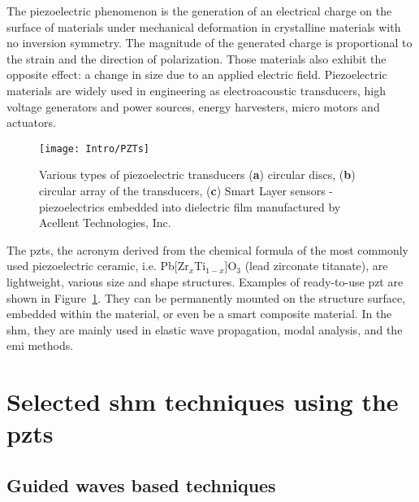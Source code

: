 \documentclass[11pt,a4paper,final]{report}
\theoremstyle{plain}
\begin{document}
The piezoelectric phenomenon is the generation of an electrical charge on the surface of materials under mechanical deformation in crystalline materials with no inversion symmetry.
The magnitude of the generated charge is proportional to the strain and the direction of polarization.
Those materials also exhibit the opposite effect: a change in size due to an applied electric field.
Piezoelectric materials are widely used in engineering as electroacoustic transducers, high voltage generators and power sources, energy harvesters, micro motors and actuators.
\begin{figure}[H]
	\begin{center}
		\texttt{[image: Intro/PZTs]}
	\end{center}
	\caption{Various types of piezoelectric transducers (\textbf{a}) circular discs, (\textbf{b}) circular array of the transducers, (\textbf{c}) Smart Layer\textsuperscript{\tiny\textregistered} sensors - piezoelectrics embedded into dielectric film manufactured by Acellent Technologies, Inc.}
	\label{fig:piezo}
\end{figure}
The \acp{pzt}, the acronym derived from the chemical formula of the most commonly used piezoelectric ceramic, i.e. Pb[Zr\(_x\)Ti\(_{1-x}\)]O\(_3\) (lead zirconate titanate), are lightweight, various size and shape structures.
Examples of ready-to-use \ac{pzt} are shown in Figure~\ref{fig:piezo}.
They can be permanently mounted on the structure surface, embedded within the material, or even be a smart composite material.
In the \ac{shm}, they are mainly used in elastic wave propagation, modal analysis, and the \ac{emi} methods. \section{Selected \acl{shm} techniques using the \aclp{pzt}}
\label{sec:techniques}



\subsection{Guided waves based techniques}
\end{document}
